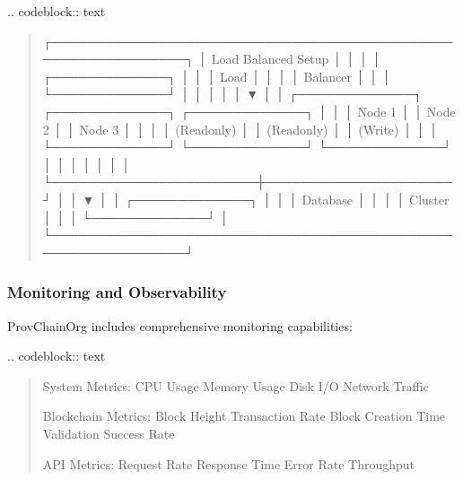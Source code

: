 \documentclass[letterpaper,10pt,english]{sphinxmanual}
\begin{document}
\sphinxAtStartPar
{}
.. code\sphinxhyphen{}block:: text
\begin{quote}

\sphinxAtStartPar
┌─────────────────────────────────────────────────────────────┐
│                    Load Balanced Setup                      │
│                                                             │
│  ┌─────────────┐                                            │
│  │    Load     │                                            │
│  │  Balancer   │                                            │
│  └─────────────┘                                            │
│        │                                                    │
│        ▼                                                    │
│  ┌─────────────┐       ┌─────────────┐       ┌─────────────┐ │
│  │   Node 1    │       │   Node 2    │       │   Node 3    │ │
│  │ (Read\sphinxhyphen{}only) │       │ (Read\sphinxhyphen{}only) │       │ (Write)     │ │
│  └─────────────┘       └─────────────┘       └─────────────┘ │
│        │                       │                     │        │
│        └───────────────────────┼─────────────────────┘        │
│                                ▼                              │
│                      ┌─────────────┐                         │
│                      │  Database   │                         │
│                      │   Cluster   │                         │
│                      └─────────────┘                         │
└─────────────────────────────────────────────────────────────┘
\end{quote}


\subsubsection{Monitoring and Observability}
\label{\detokenize{research/technical-specifications:monitoring-and-observability}}
\sphinxAtStartPar
ProvChainOrg includes comprehensive monitoring capabilities:

\sphinxAtStartPar
{}
.. code\sphinxhyphen{}block:: text
\begin{quote}

\sphinxAtStartPar
System Metrics:
\sphinxhyphen{} CPU Usage
\sphinxhyphen{} Memory Usage
\sphinxhyphen{} Disk I/O
\sphinxhyphen{} Network Traffic

\sphinxAtStartPar
Blockchain Metrics:
\sphinxhyphen{} Block Height
\sphinxhyphen{} Transaction Rate
\sphinxhyphen{} Block Creation Time
\sphinxhyphen{} Validation Success Rate

\sphinxAtStartPar
API Metrics:
\sphinxhyphen{} Request Rate
\sphinxhyphen{} Response Time
\sphinxhyphen{} Error Rate
\sphinxhyphen{} Throughput
\end{quote}
\end{document}
